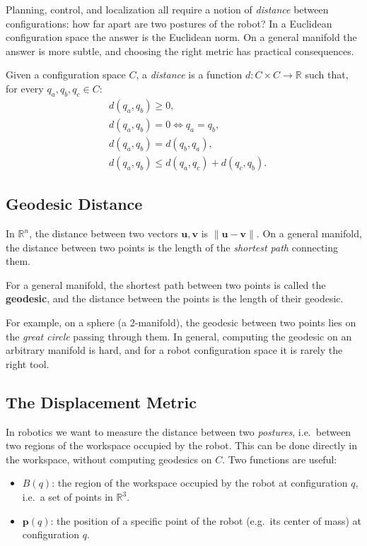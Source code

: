 Planning, control, and localization all require a notion of
\emph{distance} between configurations: how far apart are two postures
of the robot? In a Euclidean configuration space the answer is the
Euclidean norm. On a general manifold the answer is more subtle, and
choosing the right metric has practical consequences.

\begin{definition}[Distance]
\label{def:distance}
Given a configuration space \( C \), a \emph{distance} is a function
\( d : C \times C \to \mathbb{R} \) such that, for every
\( q_a, q_b, q_c \in C \):
\begin{align}
    &d(q_a, q_b) \ge 0, \\
    &d(q_a, q_b) = 0 \iff q_a = q_b, \\
    &d(q_a, q_b) = d(q_b, q_a), \\
    &d(q_a, q_b) \le d(q_a, q_c) + d(q_c, q_b).
\end{align}
\end{definition}

\subsection{Geodesic Distance}
\label{subsec:geodesic}

In \( \mathbb{R}^n \), the distance between two vectors
\( \mathbf{u}, \mathbf{v} \) is \( \|\mathbf{u} - \mathbf{v}\| \). On a
general manifold, the distance between two points is the length of the
\emph{shortest path} connecting them.

\begin{definition}[Geodesic]
For a general manifold, the shortest path between two points is called
the \textbf{geodesic}, and the distance between the points is the
length of their geodesic.
\end{definition}

For example, on a sphere (a 2-manifold), the geodesic between two
points lies on the \emph{great circle} passing through them. In
general, computing the geodesic on an arbitrary manifold is hard, and
for a robot configuration space it is rarely the right tool.

\subsection{The Displacement Metric}
\label{subsec:displacement-metric}

In robotics we want to measure the distance between two
\emph{postures}, i.e.\ between two regions of the workspace occupied by
the robot. This can be done directly in the workspace, without
computing geodesics on \( C \). Two functions are useful:
\begin{itemize}
    \item \( B(q) \): the region of the workspace occupied by the robot
          at configuration \( q \), i.e.\ a set of points in
          \( \mathbb{R}^3 \).
    \item \( \mathbf{p}(q) \): the position of a specific point of the
          robot (e.g.\ its center of mass) at configuration \( q \).
\end{itemize}

